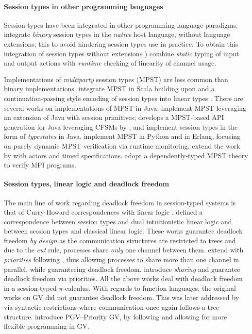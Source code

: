 \documentclass[sigplan,screen]{acmart}
\begin{document}
\paragraph{Session types in other programming languages}
Session types have been integrated in other programming language paradigms.
\citet{JML15,ScalasY16,PadFuse} integrate \emph{binary} session types in the \emph{native} host language, without language extensions; this to avoid hindering session types use in practice.
To obtain this integration of session types without extensions \citet{ScalasY16,PadFuse}) combine \emph{static} typing of input and output actions with \emph{runtime} checking of linearity of channel usage.

Implementations of \emph{multiparty} session types (MPST) are less common than binary implementations.
\citet{Scalas2017} integrate MPST in Scala building upon \citet{ScalasY16} and a continuation-passing style encoding of session types into linear types \citet{dardhagiachino12}.
There are several works on implementations of MPST in Java:
\citet{SivaramakrishnanNZE10} implement MPST leveraging an extension of Java with session primitives;
\citet{HY16} develops a MPST-based API generation for Java leveraging CFSMs by \citet{Brand1983CFM}; and \citet{KDPG16} implement session types in the form of \emph{typestates} in Java.
\citet{DHHNY2015} implement MPST in Python and \citet{Fowler16,NY2017} in Erlang, focusing on {purely dynamic} MPST verification via runtime monitoring.
\citet{NY2017A,NBY2017} extend the work by
\citet{DHHNY2015} with actors and timed specifications.
\citet{LMMNSVY2015} adopt a dependently-typed MPST theory to verify MPI programs.


\paragraph{Session types, linear logic and deadlock freedom}
The main line of work regarding deadlock freedom in session-typed systems is that of Curry-Howard correspondences with linear logic \cite{girard87}.
\citet{CP10} defined a correspondence between session types and dual intuitionistic linear logic and \citet{wadler14} between session types and classical linear logic.
These works guarantee deadlock freedom \emph{by design} as the communication structures are restricted to trees and due to the \emph{cut} rule, processes share \emph{only} one channel between them.
\citet{dardhagay18} extend \citet{wadler14} with \emph{priorities} following \citet{kobayashi06,padovani14}, thus allowing processes to share more than one channel in parallel, while guaranteeing deadlock freedom.
\citet{balzertoninho19} introduce \emph{sharing} and guarantee deadlock freedom via priorities.
All the above works deal with deadlock freedom in a session-typed $\pi$-calculus.
With regards to function languages, the original works on GV \cite{gayvasconcelos10,gayvasconcelos12} did not guarantee deadlock freedom. This was later addressed by \citet{lindleymorris15,wadler15} via syntactic restrictions where communication once again follows a tree structure. \citet{kokkedardha21} introduce PGV--Priority GV, by following \citet{dardhagay18} and allowing for more flexible programming in GV.
\end{document}
